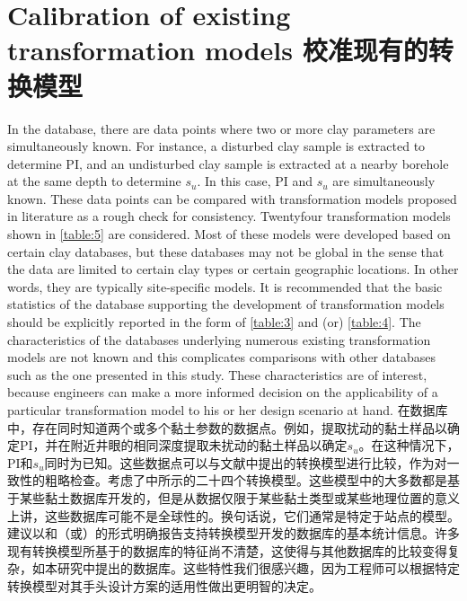 \section{Calibration of existing transformation models 校准现有的转换模型}

\begin{Parallel}{0.60\textwidth}{}
    \ParallelLText
    {
        In the database, there are data points where two or more clay parameters are simultaneously known. For instance, a disturbed clay sample is extracted to determine PI, and an undisturbed clay sample is extracted at a nearby borehole at the same depth to determine $s_u$. In this case, PI and $s_u$ are simultaneously known. These data points can be compared with transformation models proposed in literature as a rough check for consistency. Twentyfour transformation models shown in \autoref{table:5} are considered. Most of these models were developed based on certain clay databases, but these databases may not be global in the sense that the data are limited to certain clay types or certain geographic locations. In other words, they are typically site-specific models. It is recommended that the basic statistics of the database supporting the development of transformation models should be explicitly reported in the form of \autoref{table:3} and (or) \autoref{table:4}. The characteristics of the databases underlying numerous existing transformation models are not known and this complicates comparisons with other databases such as the one presented in this study. These characteristics are of interest, because engineers can make a more informed decision on the applicability of a particular transformation model to his or her design scenario at hand.
    }
    \ParallelRText
    {
        在数据库中，存在同时知道两个或多个黏土参数的数据点。例如，提取扰动的黏土样品以确定PI，并在附近井眼的相同深度提取未扰动的黏土样品以确定$s_u$。在这种情况下，PI和$s_u$同时为已知。这些数据点可以与文献中提出的转换模型进行比较，作为对一致性的粗略检查。考虑了中所示的二十四个转换模型。这些模型中的大多数都是基于某些黏土数据库开发的，但是从数据仅限于某些黏土类型或某些地理位置的意义上讲，这些数据库可能不是全球性的。换句话说，它们通常是特定于站点的模型。建议以和（或）的形式明确报告支持转换模型开发的数据库的基本统计信息。许多现有转换模型所基于的数据库的特征尚不清楚，这使得与其他数据库的比较变得复杂，如本研究中提出的数据库。这些特性我们很感兴趣，因为工程师可以根据特定转换模型对其手头设计方案的适用性做出更明智的决定。
    }
    \ParallelPar
    

\end{Parallel}
